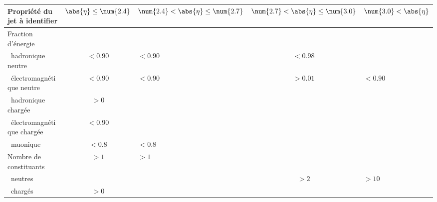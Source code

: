 \begin{tabularx}{\textwidth}{lcYcY}
\toprule
Propriété du jet à identifier & $\abs{\eta}\leq\num{2.4}$ & $\num{2.4}<\abs{\eta}\leq\num{2.7}$ & $\num{2.7}<\abs{\eta}\leq\num{3.0}$ & $\num{3.0}<\abs{\eta}$ \\
\midrule
Fraction d'énergie\\
\ hadronique neutre & $<\num{0.90}$ & $<\num{0.90}$ & $<\num{0.98}$ & \\
\ électromagnétique neutre & $<\num{0.90}$ & $<\num{0.90}$ & $>\num{0.01}$ & $<\num{0.90}$ \\
\ hadronique chargée & $>\num{0}$ &&&\\
\ électromagnétique chargée & $<\num{0.90}$ &&&\\
\ muonique & $<\num{0.8}$ & $<\num{0.8}$ \\
\midrule
Nombre de constituants & $>\num{1}$ & $>\num{1}$ && \\
\ neutres & & & $>\num{2}$ & $>\num{10}$ \\
\ chargés & $>\num{0}$ &&&\\
\bottomrule
\end{tabularx}
